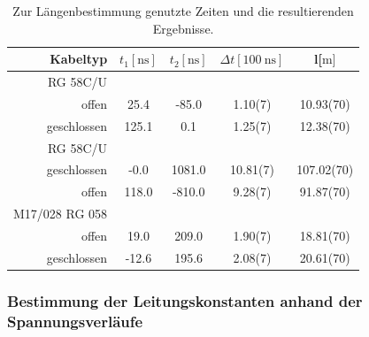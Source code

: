 \begin{table}
\centering
	\caption[]{Zur Längenbestimmung genutzte Zeiten und die resultierenden Ergebnisse.}
    \begin{tabular}{r S[table-format=3.1] S[table-format=4.1] S[table-format=2.2(1)] S[table-format=3.2(2)]}
	\toprule
    Kabeltyp & {$t_1[\si{\nano\second}]$} & {$t_2[\si{\nano\second}]$} & {$\Delta t[\SI{100}{\nano\second}]$} & {l[$\si{\meter}]$}\\
		\midrule
		 RG 58C/U & & & & \\
        offen        & 	  25.4	&   -85.0	&	 1.10(7) &	 10.93(70)\\
        geschlossen	 & 125.1	&     0.1	&	 1.25(7) &	 12.38(70)\\
		RG 58C/U & &&&\\
        geschlossen	 &  -0.0	&  1081.0	&	10.81(7) &	107.02(70)\\
		offen	     & 118.0	&  -810.0	&	 9.28(7) &	 91.87(70)\\
		M17/028 RG 058&&&&\\
        offen 	     & 19.0	    &   209.0	&	 1.90(7) &	 18.81(70)\\
        geschlossen	 & -12.6	&   195.6	&	 2.08(7) &	 20.61(70)\\
		\bottomrule
	\end{tabular}
	\label{tab_zeit1}
\end{table}
\FloatBarrier
\subsubsection{Bestimmung der Leitungskonstanten anhand der Spannungsverläufe} %
\label{sub:bestimmung_der_kabellaenge_anhand_der_spannungsverlaeufe}

